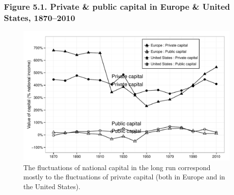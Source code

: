 \documentclass[t]{beamer}\usepackage[]{graphicx}\usepackage[]{color}
\newenvironment{knitrout}{}{} %
\begin{document}
\begin{frame}[label=Figure_5_1]
\frametitle{Figure 5.1. Private \& public capital in Europe \& United States, 1870--2010}
\begin{figure}[t]
\begin{minipage}[b]{\textwidth}
\centering
\begin{knitrout}\footnotesize
{}\color{fgcolor}

{\centering \includegraphics[width=1\linewidth]{figures/bw/Figure_5_1} 

}



\end{knitrout}
\caption{The fluctuations of national capital in the long run correspond mostly to the fluctuations of private capital (both in Europe and in the United States).}
\end{minipage}
\end{figure}
\end{frame}
\end{document}
